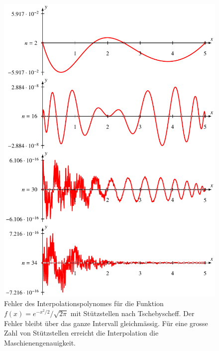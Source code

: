 \begin{figure}
\centering
\includegraphics{chapters/30-interpolation/figures/tscheb.pdf}
\caption{Fehler des Interpolationspolynomes für die Funktion
$f(x)=e^{-x^2/2}/\sqrt{2\pi}$ mit Stützstellen nach Tschebyscheff.
Der Fehler bleibt über das ganze Intervall gleichmässig.
Für eine grosse Zahl von Stützstellen erreicht die Interpolation die
Maschienengenauigkeit.
\label{buch:figure:tschebyschefffehler}}
\end{figure}





